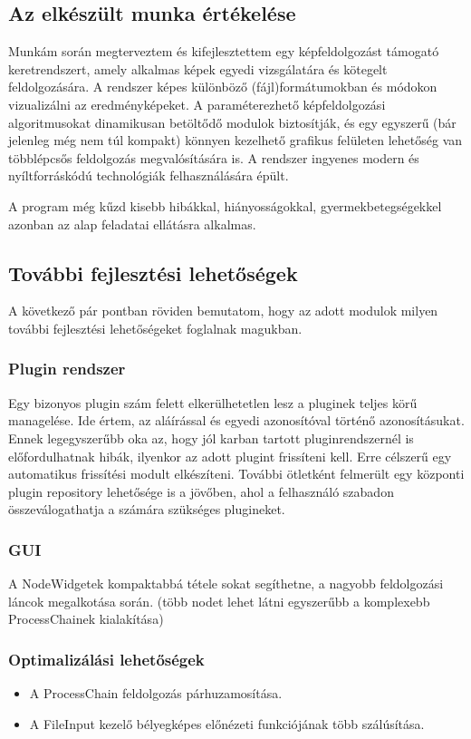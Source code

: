 \documentclass[a4paper,12pt,oneside]{report}
\begin{document}
\subsection{Az elkészült munka értékelése}

Munkám során megterveztem és kifejlesztettem egy képfeldolgozást támogató keretrendszert, amely alkalmas képek egyedi vizsgálatára és kötegelt feldolgozására. A rendszer képes különböző (fájl)formátumokban és módokon vizualizálni az eredményképeket. A paraméterezhető képfeldolgozási algoritmusokat dinamikusan betöltődő modulok biztosítják, és egy egyszerű (bár jelenleg még nem túl kompakt) könnyen kezelhető grafikus felületen lehetőség van többlépcsős feldolgozás megvalósítására is. A rendszer ingyenes modern és nyíltforráskódú technológiák felhasználására épült.

A program még kűzd kisebb hibákkal, hiányosságokkal, gyermekbetegségekkel azonban az alap feladatai ellátásra alkalmas.

\subsection{További fejlesztési lehetőségek}
A következő pár pontban röviden bemutatom, hogy az adott modulok milyen további fejlesztési lehetőségeket foglalnak magukban.
\subsubsection{Plugin rendszer}
Egy bizonyos plugin szám felett elkerülhetetlen lesz a pluginek teljes körű managelése. Ide értem, az aláírással és egyedi azonosítóval történő azonosításukat. Ennek legegyszerűbb oka az, hogy jól karban tartott pluginrendszernél is előfordulhatnak hibák, ilyenkor az adott plugint frissíteni kell. Erre célszerű egy automatikus frissítési modult elkészíteni. További ötletként felmerült egy központi plugin repository lehetősége is a jövőben, ahol a felhasználó szabadon összeválogathatja a számára szükséges plugineket.
\subsubsection{GUI}
A NodeWidgetek kompaktabbá tétele sokat segíthetne, a nagyobb feldolgozási láncok megalkotása során. (több nodet lehet látni egyszerűbb a komplexebb ProcessChainek kialakítása)
\subsubsection{Optimalizálási lehetőségek}
\begin{itemize}
	\itemsep0em
	\item A ProcessChain feldolgozás párhuzamosítása.
	\item  A FileInput kezelő bélyegképes előnézeti funkciójának több szálúsítása.
\end{itemize}
\end{document}
